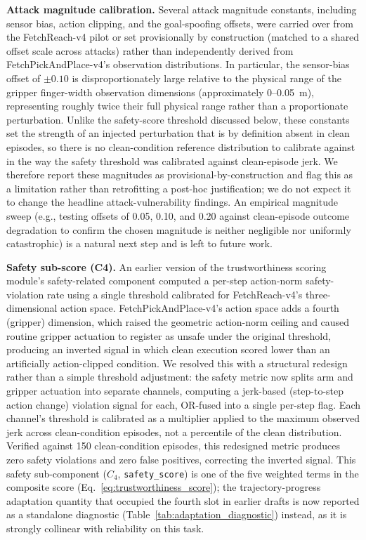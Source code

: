 \documentclass[conference]{IEEEtran}
\begin{document}
\textbf{Attack magnitude calibration.}
Several attack magnitude constants, including sensor bias, action clipping, and the
goal-spoofing offsets, were carried over from the FetchReach-v4 pilot or set
provisionally by construction (matched to a shared offset scale across attacks) rather
than independently derived from FetchPickAndPlace-v4's observation distributions. In
particular, the sensor-bias offset of $\pm 0.10$ is disproportionately large relative to
the physical range of the gripper finger-width observation dimensions (approximately
0--0.05~m), representing roughly twice their full physical range rather than a
proportionate perturbation. Unlike the safety-score threshold discussed below, these
constants set the strength of an injected perturbation that is by definition absent in
clean episodes, so there is no clean-condition reference distribution to calibrate
against in the way the safety threshold was calibrated against clean-episode jerk. We
therefore report these magnitudes as provisional-by-construction and flag this as a
limitation rather than retrofitting a post-hoc justification; we do not expect it to
change the headline attack-vulnerability findings. An empirical magnitude sweep (e.g.,
testing offsets of 0.05, 0.10, and 0.20 against clean-episode outcome degradation to
confirm the chosen magnitude is neither negligible nor uniformly catastrophic) is a
natural next step and is left to future work.

\textbf{Safety sub-score (C4).}
An earlier version of the trustworthiness scoring module's safety-related component
computed a per-step action-norm safety-violation rate using a single threshold
calibrated for FetchReach-v4's three-dimensional action space. FetchPickAndPlace-v4's
action space adds a fourth (gripper) dimension, which raised the geometric action-norm
ceiling and caused routine gripper actuation to register as unsafe under the original
threshold, producing an inverted signal in which clean execution scored lower than an
artificially action-clipped condition. We resolved this with a structural redesign
rather than a simple threshold adjustment: the safety metric now splits arm and gripper
actuation into separate channels, computing a jerk-based (step-to-step action change)
violation signal for each, OR-fused into a single per-step flag. Each channel's
threshold is calibrated as a multiplier applied to the maximum observed jerk across
clean-condition episodes, not a percentile of the clean distribution. Verified against
150 clean-condition episodes, this redesigned metric produces zero safety violations
and zero false positives, correcting the inverted signal. This safety sub-component
($C_4$, \texttt{safety\_score}) is one of the five weighted terms in the composite score
(Eq.~\ref{eq:trustworthiness_score}); the trajectory-progress adaptation quantity that
occupied the fourth slot in earlier drafts is now reported as a standalone diagnostic
(Table~\ref{tab:adaptation_diagnostic}) instead, as it is strongly collinear with
reliability on this task.
\end{document}
